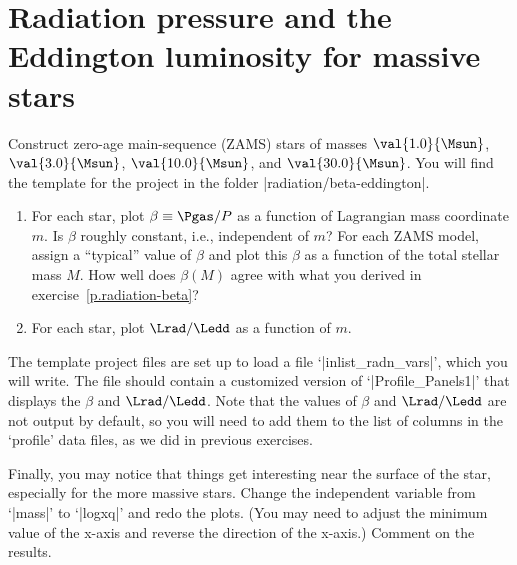 
\DefineShortVerb{\|}

\section*{ Radiation pressure and the Eddington luminosity for massive stars}

Construct zero-age main-sequence (ZAMS) stars of masses $\val{1.0}{\Msun}$, $\val{3.0}{\Msun}$, $\val{10.0}{\Msun}$, and $\val{30.0}{\Msun}$. You will find the template for the project in  the folder |radiation/beta-eddington|. 

\begin{enumerate}
\item For each star, plot $\beta\equiv \Pgas/P$ as a function of Lagrangian mass coordinate $m$. Is $\beta$ roughly constant, i.e., independent of $m$? For each ZAMS model, assign a ``typical'' value of $\beta$ and plot this $\beta$ as a function of the total stellar mass $M$.  How well does $\beta(M)$ agree with what you derived in exercise~\ref{p.radiation-beta}?

\item For each star, plot $\Lrad/\Ledd$ as a function of $m$.
\end{enumerate}
The template project files are set up to load a file `|inlist_radn_vars|', which you will write.  The file should contain a customized version of `|Profile_Panels1|' that displays the $\beta$ and $\Lrad/\Ledd$. Note that the values of $\beta$ and $\Lrad/\Ledd$ are not output by default, so you will need to add them to the list of columns in the `profile' data files, as we did in previous exercises.

Finally, you may notice that things get interesting near the surface of the star, especially for the more massive stars.  Change the independent variable from `|mass|' to `|logxq|' and redo the plots. (You may need to adjust the minimum value of the x-axis and reverse the direction of the x-axis.) Comment on the results.

\UndefineShortVerb{\|}
